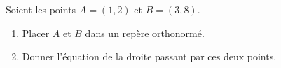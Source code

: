 
\begin{exercice}\label{exosmath-0434}

    Soient les points \( A=(1,2)\) et \( B=(3,8)\). 
    \begin{enumerate}
        \item
            Placer \( A\) et \( B\) dans un repère orthonormé.
        \item
            Donner l'équation de la droite passant par ces deux points.
    \end{enumerate}

\end{exercice}
